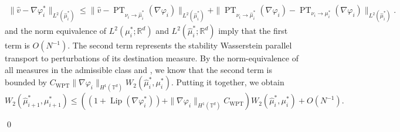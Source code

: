 \documentclass[11pt]{article}
\newcommand{\PT}{\operatorname{PT}}
\begin{document}
\begin{align*}
    \|\hat{v} - \nabla\varphi_i^*\|_{L^2(\hat\mu_i^*)} \leq \|\hat{v} - {\PT}_{\nu_i \rightarrow \hat\mu_i^*}(\nabla \varphi_i)\|_{L^2(\hat\mu_i^*)} + \|{\PT}_{\nu_i \rightarrow \hat\mu_i^*}(\nabla \varphi_i) - {\PT}_{\nu_i \rightarrow \mu_i^*}(\nabla\varphi_i)\|_{L^2(\hat\mu_i^*)}.
\end{align*}
 and the norm equivalence of $L^2(\mu_i^*; \mathbb{R}^d)$ and $L^2(\hat\mu_i^*; \mathbb{R}^d)$ imply that the first term is $O(N^{-1})$. The second term represents the stability Wasserstein parallel transport to perturbations of its destination measure. By the norm-equivalence of all measures in the admissible class and , we know that the second term is bounded by $C_{\text{WPT}}\|\nabla \varphi_i\|_{H^1(\mathbb{T}^d)}W_2(\hat \mu_i^*, \mu_i^*).$ Putting it together, we obtain
\[W_2(\hat\mu_{i+1}^*, \mu_{i+1}^*) \leq \left((1 + {\operatorname{Lip}}(\nabla \varphi_i^*)) + \|\nabla \varphi_i\|_{H^1(\mathbb{T}^d)}C_{\text{WPT}} \right) W_2(\hat \mu_i^*, \mu_i^*) + O(N^{-1}).\]

\qed{}
 
\end{document}

